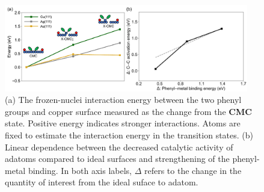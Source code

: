 \documentclass[aps,prb,reprint,amsmath,amssymb]{revtex4-1}
\begin{document}
\begin{figure}[hbt]
\centering
\includegraphics[width=0.95\textwidth]{Fig/onlysurface.pdf}
\caption{
(a) The frozen-nuclei interaction energy between the two phenyl groups and copper surface measured as the change from the \textbf{CMC} state. Positive energy indicates stronger interactions. Atoms are fixed to estimate the interaction energy in the transition states. (b) Linear dependence between the decreased catalytic activity of adatoms compared to ideal surfaces and strengthening of the phenyl-metal binding. In both axis labels, $\Delta$ refers to the change in the quantity of interest from the ideal suface to adatom.}
\label{fig:onlysurface}
\end{figure}
\end{document}
